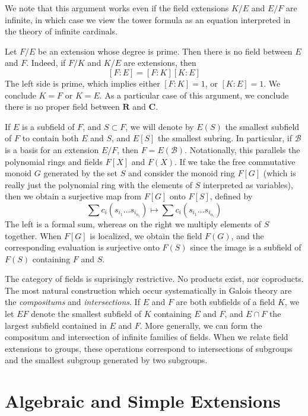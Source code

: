 We note that this argument works even if the field extensions $K/E$ and $E/F$ are infinite, in which case we view the tower formula as an equation interpreted in the theory of infinite cardinals.

\begin{example}
    Let $F/E$ be an extension whose degree is prime. Then there is no field between $E$ and $F$. Indeed, if $F/K$ and $K/E$ are extensions, then
    \[ [F:E] = [F:K][K:E] \]
    The left side is prime, which implies either $[F:K] = 1$, or $[K:E] = 1$. We conclude $K = F$ or $K = E$. As a particular case of this argument, we conclude there is no proper field between $\mathbf{R}$ and $\mathbf{C}$.
\end{example}

If $E$ is a subfield of $F$, and $S \subset F$, we will denote by $E(S)$ the smallest subfield of $F$ to contain both $E$ and $S$, and $E[S]$ the smallest subring. In particular, if $\mathcal{B}$ is a basis for an extension $E/F$, then $F = E(\mathcal{B})$. Notationally, this parallels the polynomial rings and fields $F[X]$ and $F(X)$. If we take the free commutative monoid $G$ generated by the set $S$ and consider the monoid ring $F[G]$ (which is really just the polynomial ring with the elements of $S$ interpreted as variables), then we obtain a surjective map from $F[G]$ onto $F[S]$, defined by
%
\[ \sum c_i (s_{i_1} \dots s_{i_{n_i}}) \mapsto \sum c_i (s_{i_1} \dots s_{i_{n_i}}) \]
%
The left is a formal sum, whereas on the right we multiply elements of $S$ together. When $F[G]$ is localized, we obtain the field $F(G)$, and the corresponding evaluation is surjective onto $F(S)$ since the image is a subfield of $F(S)$ containing $F$ and $S$.

The category of fields is suprisingly restrictive. No products exist, nor coproducts. The most natural construction which occur systematically in Galois theory are the \emph{compositums} and \emph{intersections}. If $E$ and $F$ are both subfields of a field $K$, we let $EF$ denote the smallest subfield of $K$ containing $E$ and $F$, and $E \cap F$ the largest subfield contained in $E$ and $F$. More generally, we can form the compositum and intersection of infinite families of fields. When we relate field extensions to groups, these operations correspond to intersections of subgroups and the smallest subgroup generated by two subgroups.

\section{Algebraic and Simple Extensions}

